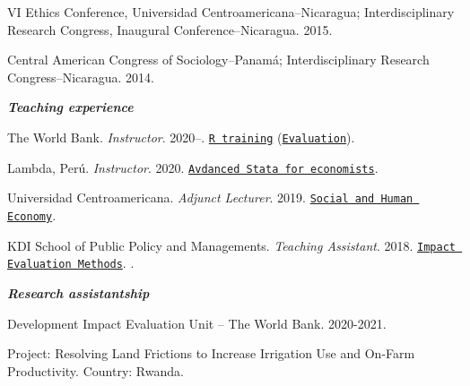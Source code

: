 \documentclass[11pt,article,oneside, a4paper]{memoir}
\begin{document}
\ind VI Ethics Conference, Universidad Centroamericana–Nicaragua; Interdisciplinary Research Congress,
Inaugural Conference–Nicaragua. 2015. 

\ind Central American Congress of Sociology–Panamá; Interdisciplinary Research Congress–Nicaragua. 2014. 

\medskip


\noindent\emph{\textbf{Teaching experience} \vspace{0.05in}}

\ind The World Bank. \emph{Instructor}. 2020--. \newline \texttt{\href{https://github.com/worldbank/dime-r-training}{R training}} (\texttt{\href{https://rrmaximiliano.github.io/docs/evaluation-esh.pdf}{Evaluation}}). 

\ind Lambda, Perú. \emph{Instructor}. 2020. \newline \texttt{\href{https://github.com/lambda-stata/course-materials}{Avdanced Stata for economists}}. 

\ind Universidad Centroamericana. \emph{Adjunct Lecturer}. 2019. \newline \texttt{\href{https://github.com/econsoc-uca}{Social and Human Economy}}.  

\ind KDI School of Public Policy and Managements. \emph{Teaching Assistant}. 2018.  \newline \texttt{\href{https://www.dropbox.com/home/teaching_materials/kdischool/spring_2018_impact_evaluation}{Impact Evaluation Methods}}. \newline \texttt{\color{DarkSlateBlue}{Foundations of Sustainable Development}}. 

\medskip
\noindent\emph{\textbf{Research assistantship} \vspace{0.05in}}

\ind Development Impact Evaluation Unit -- The World Bank. 2020-2021.

\ind \hspace{0.35in} \footnotesize Project: Resolving Land Frictions to Increase Irrigation Use and On-Farm Productivity. \newline Country: Rwanda. \normalsize \vspace{0.01in}
\end{document}
